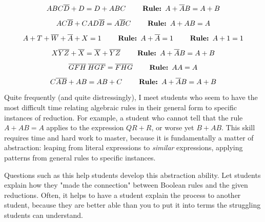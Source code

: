 $$ABC \overline{D} + D = D + ABC \hskip 20pt \hbox{ \bf Rule: } A + \overline{A}B = A + B$$

$$AC \overline{B} + CAD \overline{B} = A \overline{B} C \hskip 20pt \hbox{ \bf Rule: } A + AB = A$$

$$A + T + \overline{W} + \overline{A} + X = 1 \hskip 20pt \hbox{ \bf Rule: } A + \overline{A} = 1 \hskip 20pt \hbox{ \bf Rule: } A + 1 = 1$$

$$X\overline{YZ} + \overline{X} = \overline{X} + \overline{YZ} \hskip 20pt \hbox{ \bf Rule: } A + \overline{A}B = A + B$$

$$\overline{GFH} \> \overline{HGF} = \overline{FHG} \hskip 20pt \hbox{ \bf Rule: } AA = A$$

$$C\overline{AB} + AB = AB + C \hskip 20pt \hbox{ \bf Rule: } A + \overline{A}B = A + B$$







Quite frequently (and quite distressingly), I meet students who seem to have the most difficult time relating algebraic rules in their general form to specific instances of reduction.  For example, a student who cannot tell that the rule $A + AB = A$ applies to the expression $QR + R$, or worse yet $B + AB$.  This skill requires time and hard work to master, because it is fundamentally a matter of abstraction: leaping from literal expressions to {\it similar} expressions, applying patterns from general rules to specific instances.

Questions such as this help students develop this abstraction ability.  Let students explain how they "made the connection" between Boolean rules and the given reductions.  Often, it helps to have a student explain the process to another student, because they are better able than you to put it into terms the struggling students can understand.




